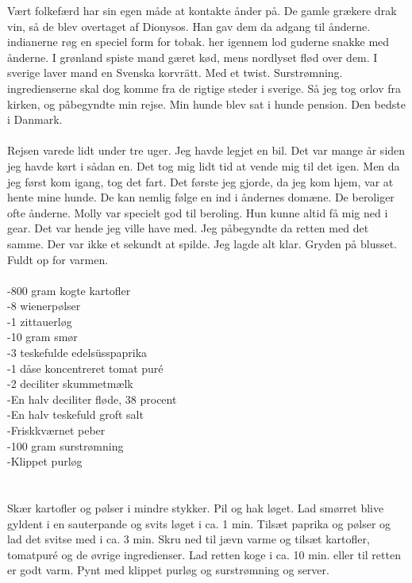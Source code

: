 \documentclass[]{article}
\begin{document}
Vært folkefærd har sin egen måde at kontakte ånder på. De gamle grækere drak vin, så de blev overtaget af Dionysos. Han gav dem da adgang til ånderne. indianerne røg en speciel form for tobak. her igennem lod guderne snakke med ånderne. I grønland spiste mand gæret kød, mens nordlyset flød over dem. I sverige laver mand en Svenska korvrätt. Med et twist. Surstrømning. ingredienserne skal dog komme fra de rigtige steder i sverige. Så jeg tog orlov fra kirken, og påbegyndte min rejse. Min hunde blev sat i hunde pension. Den bedste i Danmark.
\\ \\
Rejsen varede lidt under tre uger. Jeg havde legjet en bil. Det var mange år siden jeg havde kørt i sådan en. Det tog mig lidt tid at vende mig til det igen. Men da jeg først kom igang, tog det fart. Det første jeg gjorde, da jeg kom hjem, var at hente mine hunde. De kan nemlig følge en ind i åndernes domæne. De beroliger ofte ånderne. Molly var specielt god til beroling. Hun kunne altid få mig ned i gear. Det var hende jeg ville have med. Jeg påbegyndte da retten med det samme. Der var ikke et sekundt at spilde. Jeg lagde alt klar. Gryden på blusset. Fuldt op for varmen.
\\ \\
-800 gram kogte kartofler \\
-8 wienerpølser \\
-1 zittauerløg \\
-10 gram smør \\
-3 teskefulde edelsüsspaprika \\
-1 dåse koncentreret tomat puré \\
-2 deciliter skummetmælk \\
-En halv deciliter fløde, 38 procent \\
-En halv teskefuld groft salt \\
-Friskkværnet peber \\
-100 gram surstrømning \\
-Klippet purløg \\
\\ \\
Skær kartofler og pølser i mindre stykker. Pil og hak løget. Lad smørret blive gyldent i en sauterpande og svits løget i ca. 1 min. Tilsæt paprika og pølser og lad det svitse med i ca. 3 min. Skru ned til jævn varme og tilsæt kartofler, tomatpuré og de øvrige ingredienser. Lad retten koge i ca. 10 min. eller til retten er godt varm. Pynt med klippet purløg og surstrømning og server.
\\ \\
\end{document}
